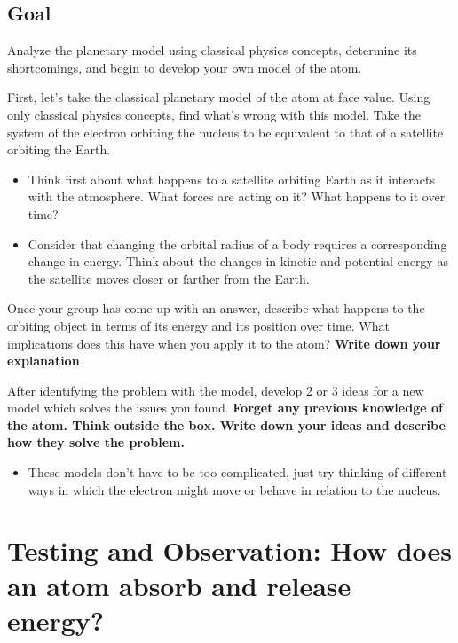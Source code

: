 \subsection{Goal} 
Analyze the planetary model using classical physics concepts, determine its shortcomings, and begin to develop your own model of the atom. 

\begin{steps} 
	\item First, let's take the classical planetary model of the atom at face value. Using only classical physics concepts, find what's wrong with this model. Take the system of the electron orbiting the nucleus to be equivalent to that of a satellite orbiting the Earth. 
	\begin{itemize} 
		\item Think first about what happens to a satellite orbiting Earth as it interacts with the atmosphere. What forces are acting on it? What happens to it over time?
		
		\item Consider that changing the orbital radius of a body requires a corresponding change in energy. Think about the changes in kinetic and potential energy as the satellite moves closer or farther from the Earth. 
	\end{itemize}

	\item Once your group has come up with an answer, describe what happens to the orbiting object in terms of its energy and its position over time. What implications does this have when you apply it to the atom? \textbf{Write down your explanation}
	
	\item After identifying the problem with the model, develop 2 or 3 ideas for a new model which solves the issues you found. \textbf{Forget any previous knowledge of the atom. Think outside the box. Write down your ideas and describe how they solve the problem.} 
	\begin{itemize}
		\item These models don't have to be too complicated, just try thinking of different ways in which the electron might move or behave in relation to the nucleus.
	\end{itemize} 
\end{steps}

\section{Testing and Observation: How does an atom absorb and release energy?} 

